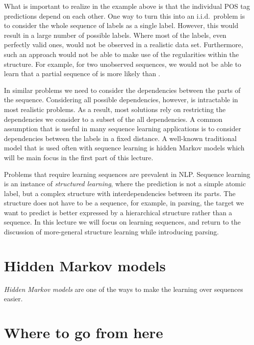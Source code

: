 What is important to realize in the example above is that
the individual POS tag predictions depend on each other.
One way to turn this into an i.i.d.\ problem is to 
consider the whole sequence of labels as a single label.
However, this would result in a large number of possible labels.%
Where most of the labels, even perfectly valid ones,
would not be observed in a realistic data set.
Furthermore, such an approach would not be able to make use of the 
regularities within the structure.
For example, for two unobserved sequences,
we would not be able to learn that a partial sequence of 
is more likely than .

In similar problems 
we need to consider the dependencies between the parts of the sequence.
Considering all possible dependencies,
however, is intractable in most realistic problems.
As a result, most solutions rely on restricting the dependencies we consider
to a subset of the all dependencies.
A common assumption that is useful in many sequence learning applications
is to consider dependencies between the labels in a fixed distance.
A well-known traditional model that is used often with sequence learning
is hidden Markov models which will be main focus in the first part of this lecture.

Problems that require learning sequences are prevalent in NLP.
Sequence learning is an instance of \emph{structured learning},
where the prediction is not a simple atomic label,
but a complex structure with interdependencies between its parts.
The structure does not have to be a sequence,
for example, in parsing, the target we want to predict is
better expressed by a hierarchical structure rather than a sequence.
In this lecture we will focus on learning sequences,
and return to the discussion of more-general structure learning
while introducing parsing.

\section{Hidden Markov models}

\emph{Hidden Markov models} are one of the ways to make the learning over 
sequences easier.

\section*{Where to go from here}

\textcite{wasserman2004}

